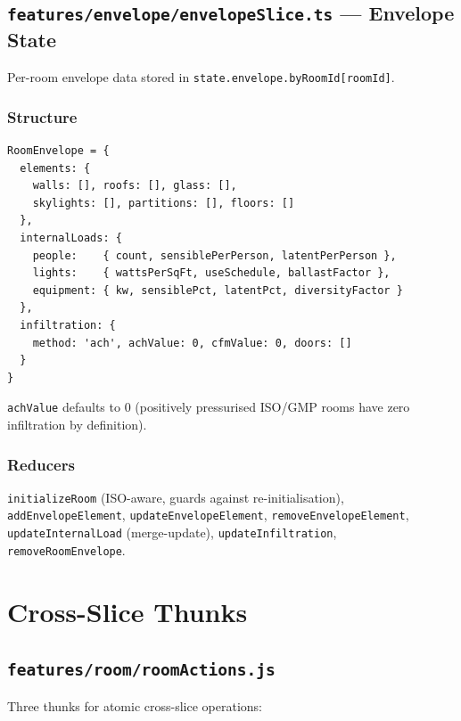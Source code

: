 \documentclass[12pt, a4paper, oneside]{report}
\newcommand{\file}[1]{\texttt{\textcolor{codeblue}{#1}}}
\newcommand{\code}[1]{\texttt{\textcolor{codered}{#1}}}
\begin{document}
\section{\file{features/envelope/envelopeSlice.ts} --- Envelope State}

Per-room envelope data stored in \code{state.envelope.byRoomId[roomId]}.

\subsection{Structure}
\begin{lstlisting}[language={}, caption={Room Envelope Structure}]
RoomEnvelope = {
  elements: {
    walls: [], roofs: [], glass: [],
    skylights: [], partitions: [], floors: []
  },
  internalLoads: {
    people:    { count, sensiblePerPerson, latentPerPerson },
    lights:    { wattsPerSqFt, useSchedule, ballastFactor },
    equipment: { kw, sensiblePct, latentPct, diversityFactor }
  },
  infiltration: {
    method: 'ach', achValue: 0, cfmValue: 0, doors: []
  }
}
\end{lstlisting}

\code{achValue} defaults to 0 (positively pressurised ISO/GMP rooms have zero infiltration by definition).

\subsection{Reducers}
\code{initializeRoom} (ISO-aware, guards against re-initialisation), \code{addEnvelopeElement}, \code{updateEnvelopeElement}, \code{removeEnvelopeElement}, \code{updateInternalLoad} (merge-update), \code{updateInfiltration}, \code{removeRoomEnvelope}.


\chapter{Cross-Slice Thunks}

\section{\file{features/room/roomActions.js}}

Three thunks for atomic cross-slice operations:
\end{document}
